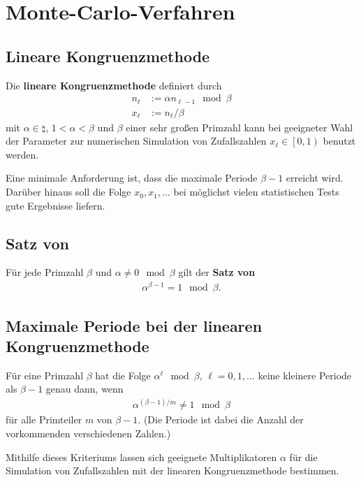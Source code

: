 \section{%
    Monte-Carlo-Verfahren%
}

\subsection{%
    Lineare Kongruenzmethode%
}

Die \textbf{lineare Kongruenzmethode} definiert durch
\begin{align*}
    n_\ell & := \alpha n_{\ell-1} \mod \beta \\
    x_\ell & := n_\ell / \beta
\end{align*}
mit $\alpha \in \natural$, $1 < \alpha < \beta$ und $\beta$
einer sehr großen Primzahl kann bei geeigneter Wahl der Parameter zur
numerischen Simulation von Zufallszahlen $x_\ell \in \left[0, 1\right)$
benutzt werden.

Eine minimale Anforderung ist, dass die maximale Periode $\beta - 1$ erreicht
wird.
Darüber hinaus soll die Folge $x_0, x_1, \dotsc$ bei möglichst vielen
statistischen Tests gute Ergebnisse liefern.

\subsection{%
    Satz von %
}

Für jede Primzahl $\beta$ und $\alpha \not= 0 \mod \beta$ gilt
der \textbf{Satz von }
\begin{align*}
    \alpha^{\beta-1} = 1 \mod \beta.
\end{align*}

\subsection{%
    Maximale Periode bei der linearen Kongruenzmethode%
}

Für eine Primzahl $\beta$ hat die Folge $\alpha^\ell \mod \beta$,
$\ell = 0, 1, \dotsc$ keine kleinere Periode als $\beta - 1$ genau dann, wenn
\begin{align*}
    \alpha^{(\beta-1)/m} \not= 1 \mod \beta
\end{align*}
für alle Primteiler $m$ von $\beta - 1$.
(Die Periode ist dabei die Anzahl der vorkommenden verschiedenen Zahlen.)

Mithilfe dieses Kriteriums lassen sich geeignete Multiplikatoren $\alpha$
für die Simulation von Zufallszahlen mit der linearen Kongruenzmethode
bestimmen.

